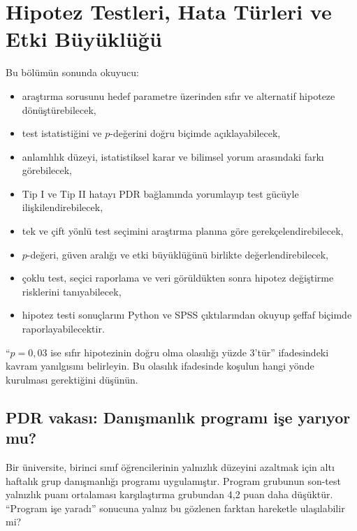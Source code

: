 \chapter{Hipotez Testleri, Hata Türleri ve Etki Büyüklüğü}

\begin{hedefler}
Bu bölümün sonunda okuyucu:
\begin{itemize}
  \item araştırma sorusunu hedef parametre üzerinden sıfır ve alternatif hipoteze dönüştürebilecek,
  \item test istatistiğini ve $p$-değerini doğru biçimde açıklayabilecek,
  \item anlamlılık düzeyi, istatistiksel karar ve bilimsel yorum arasındaki farkı görebilecek,
  \item Tip I ve Tip II hatayı PDR bağlamında yorumlayıp test gücüyle ilişkilendirebilecek,
  \item tek ve çift yönlü test seçimini araştırma planına göre gerekçelendirebilecek,
  \item $p$-değeri, güven aralığı ve etki büyüklüğünü birlikte değerlendirebilecek,
  \item çoklu test, seçici raporlama ve veri görüldükten sonra hipotez değiştirme risklerini tanıyabilecek,
  \item hipotez testi sonuçlarını Python ve SPSS çıktılarından okuyup şeffaf biçimde raporlayabilecektir.
\end{itemize}
\end{hedefler}

\begin{hazirlik}
``$p=0{,}03$ ise sıfır hipotezinin doğru olma olasılığı yüzde 3'tür''
ifadesindeki kavram yanılgısını belirleyin. Bu olasılık ifadesinde koşulun
hangi yönde kurulması gerektiğini düşünün.
\end{hazirlik}

\section{PDR vakası: Danışmanlık programı işe yarıyor mu?}

Bir üniversite, birinci sınıf öğrencilerinin yalnızlık düzeyini azaltmak için
altı haftalık grup danışmanlığı programı uygulamıştır. Program grubunun
son-test yalnızlık puanı ortalaması karşılaştırma grubundan 4,2 puan daha
düşüktür. ``Program işe yaradı'' sonucuna yalnız bu gözlenen farktan hareketle
ulaşılabilir mi?

